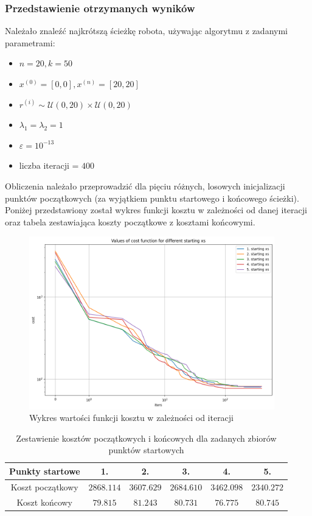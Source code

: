 \documentclass{article}
\begin{document}
\subsubsection{Przedstawienie otrzymanych wyników}
Należało znaleźć najkrótszą ścieżkę robota, używając algorytmu z zadanymi parametrami:
\begin{itemize}
\item $n=20, k=50$
\item $x^{(0)} = [0,0], x^{(n)} = [20,20]$
\item $r^{(i)} \sim \mathcal U(0,20) \times \mathcal U(0,20)$
\item $\lambda_1 = \lambda_2 = 1$
\item $\varepsilon = 10^{-13}$
\item liczba iteracji = $400$
\end{itemize}
Obliczenia należało przeprowadzić dla pięciu różnych, losowych inicjalizacji punktów początkowych (za wyjątkiem punktu startowego i końcowego ścieżki). Poniżej przedstawiony został wykres funkcji kosztu w zależności od danej iteracji oraz tabela zestawiająca koszty początkowe z kosztami końcowymi.
\begin{figure}[H]
    \centering
    \includegraphics[width=0.95\textwidth]{1}
    \caption{Wykres wartości funkcji kosztu w zależności od iteracji}
    \label{fig:mesh}
\end{figure}
\begin{table}[h!]
    \centering
    \begin{tabular}{|c|ccccc|}
        \hline
        Punkty startowe & 1. & 2. & 3. & 4. & 5. \\
        \hline
        Koszt początkowy & $2868.114$ & $3607.629$ & $2684.610$ & $3462.098$ & $2340.272$ \\
        Koszt końcowy & $79.815$ & $81.243$ & $80.731$ & $76.775$ & $80.745$ \\
        \hline
    \end{tabular}
    \caption{Zestawienie kosztów początkowych i końcowych dla zadanych zbiorów punktów startowych}
    \label{table}
\end{table}
\end{document}
